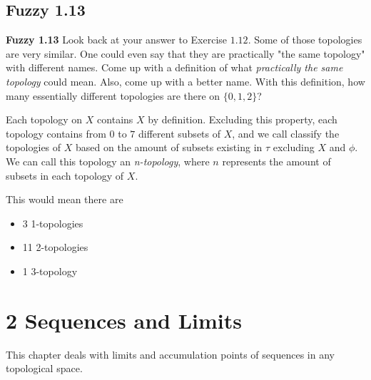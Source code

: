 \documentclass{report}
\begin{document}
\medskip

\section{Fuzzy 1.13}


\textbf{Fuzzy 1.13} Look back at your answer to Exercise $1.12$. Some of those topologies are very similar. One could even say that they are practically "the same topology" with different names. Come up with a definition of what \textit{practically the same topology} could mean. Also, come up with a better name. With this definition, how many essentially different topologies are there on $\{0, 1, 2\}$?

\medskip


\sol Each topology on $X$ contains $X$ by definition. Excluding this property, each topology contains from $0$ to $7$ different subsets of $X$, and we call classify the topologies of $X$ based on the amount of subsets existing in $\tau$ excluding $X$ and $\phi$. We can call this topology an \textit{n-topology}, where $n$ represents the amount of subsets in each topology of $X$. 



         This would mean there are 
\begin{center}
    \begin{itemize}
         \item 3 1-topologies
         \item 11 2-topologies
         \item 1 3-topology
    \end{itemize}
\end{center}
\medskip

\chapter{2 Sequences and Limits}
\medskip
\begin{center}
   This chapter deals with limits and accumulation points of sequences in any topological space.  
\end{center}
\medskip


\end{document}
